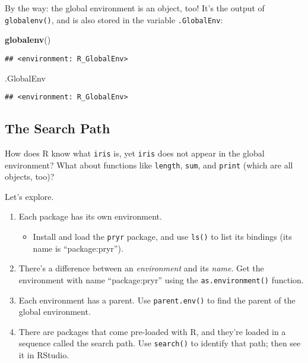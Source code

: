 \documentclass[]{article}
\newenvironment{Shaded}{\begin{snugshade}}{\end{snugshade}}
\newcommand{\KeywordTok}[1]{\textcolor[rgb]{0.13,0.29,0.53}{\textbf{#1}}}
\newcommand{\NormalTok}[1]{#1}
\providecommand{\tightlist}{%
  \setlength{\itemsep}{0pt}\setlength{\parskip}{0pt}}
\begin{document}
By the way: the global environment is an object, too! It's the output of
\texttt{globalenv()}, and is also stored in the variable
\texttt{.GlobalEnv}:

\begin{Shaded}
\begin{Highlighting}[]
\KeywordTok{globalenv}\NormalTok{()}
\end{Highlighting}
\end{Shaded}

\begin{verbatim}
## <environment: R_GlobalEnv>
\end{verbatim}

\begin{Shaded}
\begin{Highlighting}[]
\NormalTok{.GlobalEnv}
\end{Highlighting}
\end{Shaded}

\begin{verbatim}
## <environment: R_GlobalEnv>
\end{verbatim}

\subsection{The Search Path}\label{the-search-path}

How does R know what \texttt{iris} is, yet \texttt{iris} does not appear
in the global environment? What about functions like \texttt{length},
\texttt{sum}, and \texttt{print} (which are all objects, too)?

Let's explore.

\begin{enumerate}
\def\labelenumi{\arabic{enumi}.}
\item
  Each package has its own environment.

  \begin{itemize}
  \tightlist
  \item
    Install and load the \texttt{pryr} package, and use \texttt{ls()} to
    list its bindings (its name is ``package:pryr'').
  \end{itemize}
\item
  There's a difference between an \emph{environment} and its
  \emph{name}. Get the environment with name ``package:pryr'' using the
  \texttt{as.environment()} function.
\item
  Each environment has a parent. Use \texttt{parent.env()} to find the
  parent of the global environment.
\item
  There are packages that come pre-loaded with R, and they're loaded in
  a sequence called the search path. Use \texttt{search()} to identify
  that path; then see it in RStudio.
\end{enumerate}
\end{document}
